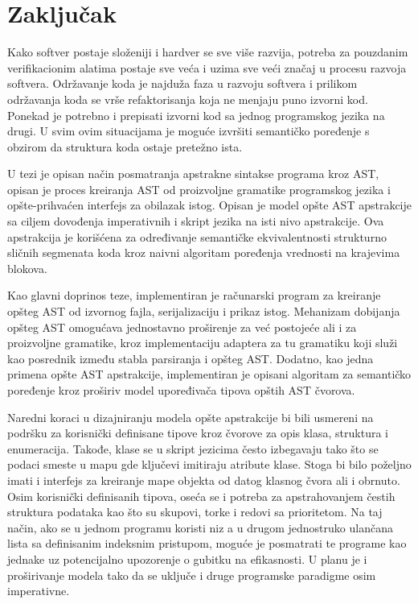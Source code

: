 \chapter{Zaključak}
\label{chp:conclusion}

Kako softver postaje složeniji i hardver se sve više razvija, potreba za pouzdanim verifikacionim alatima postaje sve veća i uzima sve veći značaj u procesu razvoja softvera. Održavanje koda je najduža faza u razvoju softvera i prilikom održavanja koda se vrše refaktorisanja koja ne menjaju puno izvorni kod. Ponekad je potrebno i prepisati izvorni kod sa jednog programskog jezika na drugi. U svim ovim situacijama je moguće izvršiti semantičko poređenje s obzirom da struktura koda ostaje pretežno ista. 

U tezi je opisan način posmatranja apstrakne sintakse programa kroz AST, opisan je proces kreiranja AST od proizvoljne gramatike programskog jezika i opšte-prihvaćen interfejs za obilazak istog. Opisan je model opšte AST apstrakcije sa ciljem dovođenja imperativnih i skript jezika na isti nivo apstrakcije. Ova apstrakcija je korišćena za određivanje semantičke ekvivalentnosti strukturno sličnih segmenata koda kroz naivni algoritam poređenja vrednosti na krajevima blokova.

Kao glavni doprinos teze, implementiran je računarski program za kreiranje opšteg AST od izvornog fajla, serijalizaciju i prikaz istog. Mehanizam dobijanja opšteg AST omogućava jednostavno proširenje za već postojeće ali i za proizvoljne gramatike, kroz implementaciju adaptera za tu gramatiku koji služi kao posrednik između stabla parsiranja i opšteg AST. Dodatno, kao jedna primena opšte AST apstrakcije, implementiran je opisani algoritam za semantičko poređenje kroz proširiv model upoređivača tipova opštih AST čvorova.

Naredni koraci u dizajniranju modela opšte apstrakcije bi bili usmereni na podršku za korisnički definisane tipove kroz čvorove za opis klasa, struktura i enumeracija. Takođe, klase se u skript jezicima često izbegavaju tako što se podaci smeste u mapu gde ključevi imitiraju atribute klase. Stoga bi bilo poželjno imati i interfejs za kreiranje mape objekta od datog klasnog čvora ali i obrnuto. Osim korisnički definisanih tipova, oseća se i potreba za apstrahovanjem čestih struktura podataka kao što su skupovi, torke i redovi sa prioritetom. Na taj način, ako se u jednom programu koristi niz a u drugom jednostruko ulančana lista sa definisanim indeksnim pristupom, moguće je posmatrati te programe kao jednake uz potencijalno upozorenje o gubitku na efikasnosti. U planu je i proširivanje modela tako da se uključe i druge programske paradigme osim imperativne.


